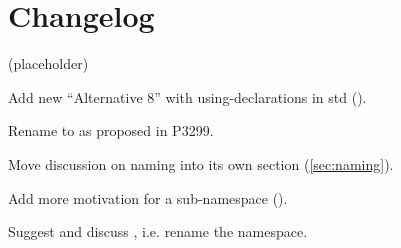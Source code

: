 \section{Changelog}
(placeholder)
\begin{revision}
\item Add new “Alternative 8” with using-declarations in std ().
\item Rename  to  as proposed in P3299.
\item Move discussion on naming into its own section (\ref{sec:naming}).
\item Add more motivation for a sub-namespace ().
\end{revision}

\begin{revision}
\item Suggest and discuss , i.e. rename the namespace.
\end{revision}
